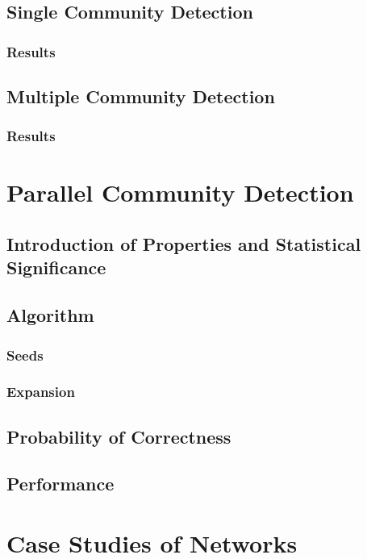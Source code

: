 \documentclass[phd,tocprelim]{cornell}
\begin{document}
\section{Single Community Detection}

\subsection{Results}

\section{Multiple Community Detection}

\subsection{Results}

\chapter{Parallel Community Detection}

\section {Introduction of Properties and Statistical Significance}

\section{Algorithm}

\subsection{Seeds}

\subsection{Expansion}

\section{Probability of Correctness}

\section {Performance}

\chapter{Case Studies of Networks}
\end{document}
